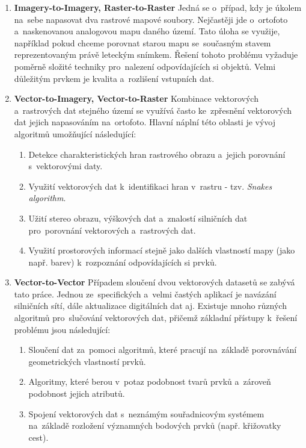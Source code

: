 \begin{enumerate}
  \item \textbf{Imagery-to-Imagery, Raster-to-Raster}
    \subitem Jedná se o~případ, kdy je úkolem na~sebe napasovat dva rastrové 
      mapové soubory. Nejčastěji jde o~ortofoto a~naskenovanou analogovou mapu
      daného území. Tato úloha se využije, například pokud chceme porovnat 
      starou mapu se~současným stavem reprezentovaným právě leteckým snímkem. 
      Řešení tohoto problému vyžaduje poměrně složité techniky pro~nalezení 
      odpovídajících si objektů. Velmi důležitým prvkem je kvalita a~rozlišení
      vstupních dat.
  \item \textbf{Vector-to-Imagery, Vector-to-Raster}
    \subitem Kombinace vektorových a~rastrových dat stejného území se využívá 
      často ke~zpřesnění vektorových dat jejich napasováním na~ortofoto. Hlavní
      náplní této oblasti je vývoj algoritmů umožňující následující: %
	      \begin{enumerate}
	       \item Detekce charakteristických hran rastrového obrazu a~jejich 
		  porovnání s~vektorovými daty.
	       \item Využití vektorových dat k~identifikaci hran v~rastru - tzv. 
		  \textit{Snakes algorithm}.
	       \item Užití stereo obrazu, výškových dat a~znalostí silničních dat
		  pro~porovnání vektorových a~rastrových dat. %
	       \item Využití prostorových informací stejně jako dalších vlastností
		  mapy (jako např. barev) k~rozpoznání odpovídajících si prvků.
	      \end{enumerate}
  \item \textbf{Vector-to-Vector}
    \subitem Případem sloučení dvou vektorových datasetů se zabývá tato práce. 
	Jednou ze~specifických a~velmi častých aplikací je navázání silničních 
	sítí, dále aktualizace digitálních dat aj. Existuje mnoho různých algoritmů
	pro~slučování vektorových dat, přičemž základní přístupy k~řešení problému 
	jsou následující: %
	      \begin{enumerate}
	       \item Sloučení dat za~pomoci algoritmů, které pracují na~základě 
		  porovnávání geometrických vlastností prvků.
	       \item Algoritmy, které berou v~potaz podobnost tvarů prvků a~zároveň
		  podobnost jejich atributů.
	       \item Spojení vektorových dat s~neznámým souřadnicovým systémem 
		  na~základě rozložení významných bodových prvků (např. křižovatky 
		  cest).
	      \end{enumerate}

\end{enumerate}


